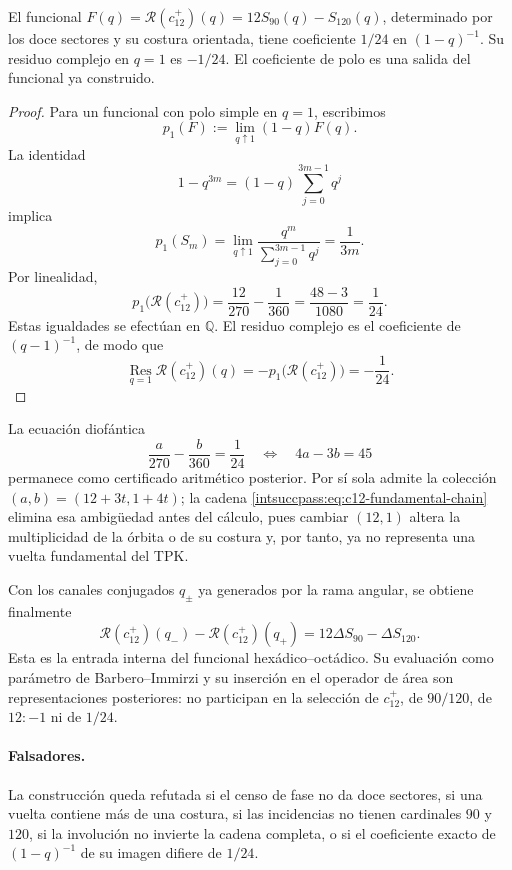 \begin{theorem}
El funcional \(F(q)=\mathscr R(c_{12}^{+})(q)
=12S_{90}(q)-S_{120}(q)\), determinado por los doce sectores
y su costura orientada, tiene coeficiente \(1/24\) en
\((1-q)^{-1}\). Su residuo complejo en \(q=1\) es \(-1/24\).
El coeficiente de polo es una salida del funcional ya construido.
\end{theorem}

\begin{proof}
Para un funcional con polo simple en \(q=1\), escribimos
\[
 p_1(F):=\lim_{q\uparrow1}(1-q)F(q).
\]
La identidad
\[
 1-q^{3m}=(1-q)\sum_{j=0}^{3m-1}q^j
\]
implica
\[
 p_1(S_m)
 =\lim_{q\uparrow1}\frac{q^m}{\sum_{j=0}^{3m-1}q^j}
 =\frac1{3m}.
\]
Por linealidad,
\[
 p_1\bigl(\mathscr R(c_{12}^{+})\bigr)
 =\frac{12}{270}-\frac1{360}
 =\frac{48-3}{1080}=\frac1{24}.
\]
Estas igualdades se efectúan en \(\mathbb Q\). El residuo complejo
es el coeficiente de \((q-1)^{-1}\), de modo que
\[
 \operatorname*{Res}_{q=1}\mathscr R(c_{12}^{+})(q)
 =-p_1\bigl(\mathscr R(c_{12}^{+})\bigr)=-\frac1{24}.
\]
\end{proof}

La ecuación diofántica
\[
 \frac a{270}-\frac b{360}=\frac1{24}
 \quad\Longleftrightarrow\quad
 4a-3b=45
\]
permanece como certificado aritmético posterior. Por sí sola admite la
colección \((a,b)=(12+3t,1+4t)\); la cadena
\eqref{intsuccpass:eq:c12-fundamental-chain} elimina esa ambigüedad antes del cálculo,
pues cambiar \((12,1)\) altera la multiplicidad de la órbita o de su costura
y, por tanto, ya no representa una vuelta fundamental del TPK.

Con los canales conjugados \(q_\pm\) ya generados por la rama angular, se
obtiene finalmente
\[
 \mathscr R(c_{12}^{+})(q_-)-
 \mathscr R(c_{12}^{+})(q_+)
 =12\Delta S_{90}-\Delta S_{120}.
\]
Esta es la entrada interna del funcional hexádico--octádico. Su evaluación
como parámetro de Barbero--Immirzi y su inserción en el operador de área son
representaciones posteriores: no participan en la selección de
\(c_{12}^{+}\), de \(90/120\), de \(12:-1\) ni de \(1/24\).

\paragraph{Falsadores.}
La construcción queda refutada si el censo de fase no da doce sectores, si
una vuelta contiene más de una costura, si las incidencias no tienen
cardinales \(90\) y \(120\), si la involución no invierte la cadena completa,
o si el coeficiente exacto de \((1-q)^{-1}\) de su imagen difiere de \(1/24\).
